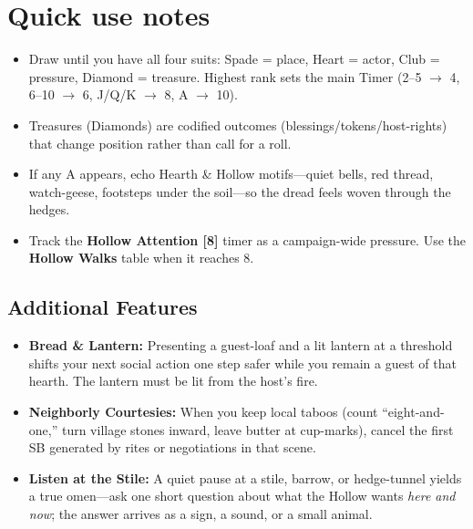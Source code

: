 \section*{Quick use notes}
\label{sec:aelaerem-quick-use}
\begin{itemize}
\item Draw until you have all four suits: Spade = place, Heart = actor, Club = pressure, Diamond = treasure. Highest rank sets the main Timer (2--5 $\rightarrow$ 4, 6--10 $\rightarrow$ 6, J/Q/K $\rightarrow$ 8, A $\rightarrow$ 10).
\item Treasures (Diamonds) are codified outcomes (blessings/tokens/host-rights) that change position rather than call for a roll.
\item If any A appears, echo Hearth \& Hollow motifs---quiet bells, red thread, watch-geese, footsteps under the soil---so the dread feels woven through the hedges.
\item Track the \textbf{Hollow Attention [8]} timer as a campaign-wide pressure. Use the \textbf{Hollow Walks} table when it reaches 8.
\end{itemize}

\subsection*{Additional Features}
\begin{itemize}
\item \textbf{Bread \& Lantern:} Presenting a guest-loaf and a lit lantern at a threshold shifts your next social action one step safer while you remain a guest of that hearth. The lantern must be lit from the host's fire.
\item \textbf{Neighborly Courtesies:} When you keep local taboos (count ``eight-and-one,'' turn village stones inward, leave butter at cup-marks), cancel the first SB generated by rites or negotiations in that scene.
\item \textbf{Listen at the Stile:} A quiet pause at a stile, barrow, or hedge-tunnel yields a true omen---ask one short question about what the Hollow wants \emph{here and now}; the answer arrives as a sign, a sound, or a small animal.
\end{itemize}

